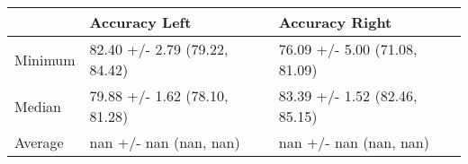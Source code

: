 \begin{tabular}{lll}
\toprule
{} &                  Accuracy Left &                 Accuracy Right \\
\midrule
Minimum &  82.40 +/- 2.79 (79.22, 84.42) &  76.09 +/- 5.00 (71.08, 81.09) \\
Median  &  79.88 +/- 1.62 (78.10, 81.28) &  83.39 +/- 1.52 (82.46, 85.15) \\
Average &         nan +/- nan (nan, nan) &         nan +/- nan (nan, nan) \\
\bottomrule
\end{tabular}
